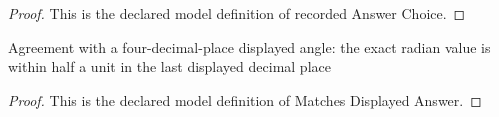 \begin{proof}
  This is the declared model definition of recorded Answer Choice.
\end{proof}
\begin{definition}
  \label{def:physics:phyx-mini-0243:phyxminiproblems-problemphyxmini0243-matchesdisplayedanswer}
  Agreement with a four-decimal-place displayed angle: the exact radian value is within half a unit in the last displayed decimal place
\end{definition}
\begin{proof}
  This is the declared model definition of Matches Displayed Answer.
\end{proof}
